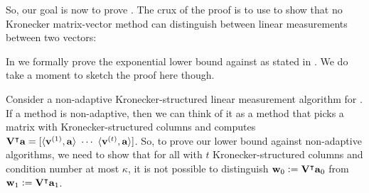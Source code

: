 So, our goal is now to prove .
The crux of the proof is to use  to show that no Kronecker matrix-vector method can distinguish between linear measurements between two vectors:
In  we formally prove the exponential lower bound against  as stated in .
We do take a moment to sketch the proof here though.

Consider a non-adaptive Kronecker-structured linear measurement algorithm for .
If a method is non-adaptive, then we can think of it as a method that picks a matrix \mV with Kronecker-structured columns and computes \(\mathbf{V}^\intercal\boldsymbol{\mathrm{a}} = [\langle \boldsymbol{\mathrm{v}}^{(1)}, \boldsymbol{\mathrm{a}}\rangle ~ \cdots ~ \langle \boldsymbol{\mathrm{v}}^{(t)}, \boldsymbol{\mathrm{a}} \rangle]\).
So, to prove our lower bound against non-adaptive algorithms, we need to show that for all \mV with \(t\) Kronecker-structured columns and condition number at most \(\kappa\), it is not possible to distinguish \(\boldsymbol{\mathrm{w}}_0 \;{\vcentcolon=}\; \mathbf{V}^\intercal\boldsymbol{\mathrm{a}}_0\) from \(\boldsymbol{\mathrm{w}}_1 \;{\vcentcolon=}\; \mathbf{V}^\intercal\boldsymbol{\mathrm{a}}_1\).

